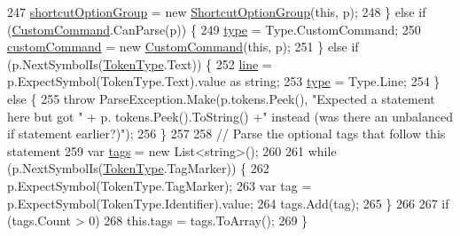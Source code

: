 \begin{DoxyCode}
247                     \hyperlink{a00140_a54d73ad69c4af4a0d61edeaea4c8ca4f}{shortcutOptionGroup} = \textcolor{keyword}{new} 
      \hyperlink{a00140_a518000e4e6219ce5f9f4229f505cd944ae8a0b2e51320b69d57d378776ee0647a}{ShortcutOptionGroup}(\textcolor{keyword}{this}, p);
248                 \} \textcolor{keywordflow}{else} \textcolor{keywordflow}{if} (\hyperlink{a00140_a518000e4e6219ce5f9f4229f505cd944af6b081742758e5cbc3a2e679e521a4fe}{CustomCommand}.CanParse(p)) \{
249                     \hyperlink{a00140_aa3fa0eb260e412720562ce06b7dc06fe}{type} = Type.CustomCommand;
250                     \hyperlink{a00140_a8a98e7d4c66f9909da865f0e671d69f2}{customCommand} = \textcolor{keyword}{new} \hyperlink{a00140_a518000e4e6219ce5f9f4229f505cd944af6b081742758e5cbc3a2e679e521a4fe}{CustomCommand}(\textcolor{keyword}{this}, p);
251                 \} \textcolor{keywordflow}{else} \textcolor{keywordflow}{if} (p.NextSymbolIs(\hyperlink{a00029_a301aa7c866593a5b625a8fc158bbeace}{TokenType}.Text)) \{
252                     \hyperlink{a00140_a37695c7b00776bb292fd64894a70fb72}{line} = p.ExpectSymbol(TokenType.Text).value as \textcolor{keywordtype}{string};
253                     \hyperlink{a00140_aa3fa0eb260e412720562ce06b7dc06fe}{type} = Type.Line;
254                 \} \textcolor{keywordflow}{else} \{
255                     \textcolor{keywordflow}{throw} ParseException.Make(p.tokens.Peek(), \textcolor{stringliteral}{"Expected a statement here but got "} + p.
      tokens.Peek().ToString() +\textcolor{stringliteral}{" instead (was there an unbalanced if statement earlier?)"});
256                 \}
257 
258                 \textcolor{comment}{// Parse the optional tags that follow this statement}
259                 var \hyperlink{a00120_a58b3a15788fd2d4127d73619dc6d04ae}{tags} = \textcolor{keyword}{new} List<string>();
260 
261                 \textcolor{keywordflow}{while} (p.NextSymbolIs(\hyperlink{a00029_a301aa7c866593a5b625a8fc158bbeace}{TokenType}.TagMarker)) \{
262                     p.ExpectSymbol(TokenType.TagMarker);
263                     var tag = p.ExpectSymbol(TokenType.Identifier).value;
264                     tags.Add(tag);
265                 \}
266 
267                 \textcolor{keywordflow}{if} (tags.Count > 0)
268                     this.tags = tags.ToArray();
269             \}
\end{DoxyCode}


